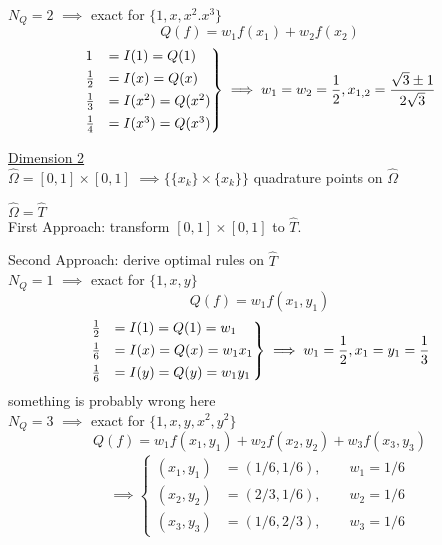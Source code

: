 $N_Q = 2$ $\implies$ exact for $\{1,x,x^2.x^3\}$
\begin{equation*}
	Q(f)= w_1f(x_1) + w_2f(x_2)
\end{equation*}
\begin{align*}
\begin{rcases}
	1 &= I(1)=Q(1)  \\
	\frac{1}{2} &= I(x)= Q(x)  \\
	\frac{1}{3}&=I(x^2)= Q(x^2) \\
	\frac{1}{4}&=I(x^3)= Q(x^3)
\end{rcases} \implies w_1=w_2= \frac{1}{2}, x_{1,2} = \frac{\sqrt{3}\pm 1}{2\sqrt{3}}
\end{align*}

\underline{Dimension 2}\\
$\hat{\Omega} = [0,1]\times [0,1]$ $\implies \{\{x_k\}\times\{x_k\} \}$ quadrature points on $\hat{\Omega}$

$\hat{\Omega} = \hat{T}$\\
First Approach: transform $[0,1]\times [0,1]$ to $\hat{T}$.

Second Approach: derive optimal rules on $\hat{T}$\\
$N_Q = 1$ $\implies$ exact for $\{1,x,y\}$
\begin{equation*}
Q(f)= w_1f(x_1,y_1)
\end{equation*}
\begin{align*}
\begin{rcases}
\frac{1}{2}&= I(1)= Q(1) = w_1  \\
\frac{1}{6}&= I(x)= Q(x) = w_1x_1  \\
\frac{1}{6}&= I(y)= Q(y) = w_1y_1\\
\end{rcases} \implies w_1= \frac{1}{2}, x_1=y_1 = \frac{1}{3}
\end{align*}
something is probably wrong here\\
$N_Q = 3$ $\implies$ exact for $\{1,x,y,x^2,y^2\}$
\begin{equation*}
Q(f)= w_1f(x_1,y_1) + w_2f(x_2,y_2) + w_3f(x_3,y_3)
\end{equation*}
\begin{align*}\implies
\begin{cases}
(x_1,y_1)&= (1/6,1/6),  \qquad w_1= 1/6\\
(x_2,y_2)&= (2/3,1/6),  \qquad w_2= 1/6\\
(x_3,y_3)&= (1/6,2/3),  \qquad w_3= 1/6
\end{cases} 
\end{align*}
